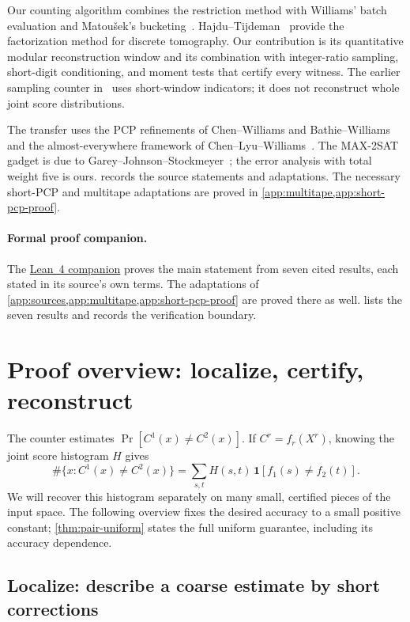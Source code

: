 \documentclass[11pt,letterpaper]{article}
\theoremstyle{definition}
\theoremstyle{remark}
\newcommand{\ind}{\mathbf 1}
\begin{document}
Our counting algorithm combines the restriction method with
Williams' batch evaluation and Matou\v{s}ek's
bucketing~\cite{KW16,CTW26,WilACC14,Mat91}. Hajdu--Tijdeman~\cite{HT01}
provide the factorization method for discrete tomography. Our
contribution is its quantitative modular reconstruction window and
its combination with integer-ratio sampling, short-digit conditioning,
and moment tests that certify every witness. The earlier sampling
counter in~\cite[Sections~4.1--4.2]{NagGate} uses short-window
indicators; it does not reconstruct whole joint score distributions.

The transfer uses the PCP refinements of Chen--Williams and
Bathie--Williams~\cite{CW19,BW24} and the almost-everywhere framework
of Chen--Lyu--Williams~\cite{CLW20}. The MAX-2SAT gadget is due to
Garey--Johnson--Stockmeyer~\cite{GJS76}; the error analysis with total
weight five is ours.  records the source statements
and adaptations. The necessary short-PCP and multitape adaptations
are proved in \cref{app:multitape,app:short-pcp-proof}.

\paragraph{Formal proof companion.}
The \href{https://github.com/devnag/near-cubic-gates-lean}{Lean~4 companion}
proves the main statement from seven cited results, each stated in its
source's own terms. The adaptations of
\cref{app:sources,app:multitape,app:short-pcp-proof} are proved there as
well.  lists the seven results and records
the verification boundary.

\section{Proof overview: localize, certify, reconstruct}
\label{sec:overview}\label{sec:idea}

The counter estimates \(\Pr[C^1(x)\ne C^2(x)]\). If
\(C^r=f_r(X^r)\), knowing the joint score histogram \(H\) gives
\[
 \#\{x:C^1(x)\ne C^2(x)\}
   =\sum_{s,t}H(s,t)\,\ind[f_1(s)\ne f_2(t)].
\]
We will recover this histogram separately on many small, certified
pieces of the input space. The following overview fixes the desired
accuracy to a small positive constant; \cref{thm:pair-uniform}
states the full uniform guarantee, including its accuracy dependence.

\subsection{Localize: describe a coarse estimate by short corrections}
\end{document}
